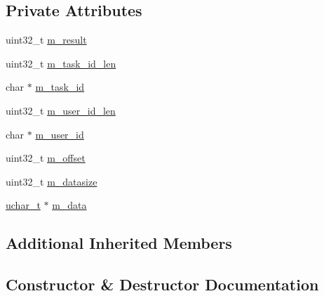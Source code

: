 \subsection*{Private Attributes}
\begin{DoxyCompactItemize}
\item 
uint32\+\_\+t \hyperlink{class_c_im_pdu_client_file_pull_data_rsp_a95c2e9f66f7342af45cbbb62aa2f70fd}{m\+\_\+result}
\item 
uint32\+\_\+t \hyperlink{class_c_im_pdu_client_file_pull_data_rsp_a8d8216ff241fd7bfab29cf2872bb31c4}{m\+\_\+task\+\_\+id\+\_\+len}
\item 
char $\ast$ \hyperlink{class_c_im_pdu_client_file_pull_data_rsp_a5ba09371442e64676094efee68b0126f}{m\+\_\+task\+\_\+id}
\item 
uint32\+\_\+t \hyperlink{class_c_im_pdu_client_file_pull_data_rsp_aa63f4ad66d36791570fd70d46bd452e2}{m\+\_\+user\+\_\+id\+\_\+len}
\item 
char $\ast$ \hyperlink{class_c_im_pdu_client_file_pull_data_rsp_a191b92cedf50d00d022a7cbb3aeb755f}{m\+\_\+user\+\_\+id}
\item 
uint32\+\_\+t \hyperlink{class_c_im_pdu_client_file_pull_data_rsp_a6dc5f3214108af1c48a134910151e182}{m\+\_\+offset}
\item 
uint32\+\_\+t \hyperlink{class_c_im_pdu_client_file_pull_data_rsp_aeec8fa98b323b153261b123e87ddf7ef}{m\+\_\+datasize}
\item 
\hyperlink{base_2ostype_8h_a124ea0f8f4a23a0a286b5582137f0b8d}{uchar\+\_\+t} $\ast$ \hyperlink{class_c_im_pdu_client_file_pull_data_rsp_a832db565246bb805640e9e9b5204376a}{m\+\_\+data}
\end{DoxyCompactItemize}
\subsection*{Additional Inherited Members}


\subsection{Constructor \& Destructor Documentation}
\hypertarget{class_c_im_pdu_client_file_pull_data_rsp_ad4d44f965e3274362e6395a07c260dcf}{}
